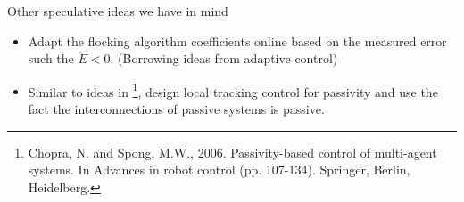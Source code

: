 \begin{frame}{Other speculative ideas we have in mind}
	\
	\begin{itemize}
		\item Adapt the flocking algorithm coefficients online based on the measured error such the $\dot{E}<0$. (Borrowing ideas from adaptive control)
		\item Similar to ideas in \footnote{Chopra, N. and Spong, M.W., 2006. Passivity-based control of multi-agent systems. In Advances in robot control (pp. 107-134). Springer, Berlin, Heidelberg.}, design local tracking control for passivity and use the fact the interconnections of passive systems is passive.
	\end{itemize}
\end{frame}
